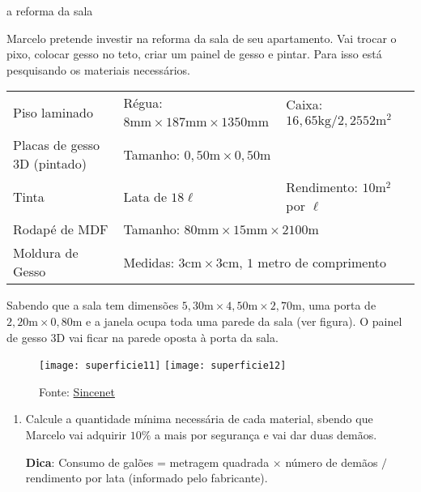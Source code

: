 \begin{task}{a reforma da sala}

Marcelo pretende investir na reforma da sala de seu apartamento. Vai trocar o pixo, colocar gesso no teto, criar um painel de gesso e pintar. Para isso está pesquisando os materiais necessários.

\begin{table}[H]
\centering
\setlength\tabcolsep{3pt}
\begin{tabular}{|l|ll|}
\hline
Piso laminado & Régua: $8\text{mm}\times187\text{mm}\times 1350$mm & Caixa: $16{,}65\text{kg}/2{,}2552\text{m}^2$ \\

Placas de gesso 3D (pintado) & Tamanho: $0{,}50\text{m}\times0{,}50\text{m}$ & \\

Tinta & Lata de $18\ell$ & Rendimento: $10\text{m}^2$ por $\ell$ \\

Rodapé de MDF & \multicolumn{2}{l|}{Tamanho: $80\text{mm}\times15\text{mm}\times2100\text{m}$} \\

Moldura de Gesso & \multicolumn{2}{l|}{Medidas: $3\text{cm}\times3\text{cm}$, $1$ metro de comprimento} \\
\hline
\end{tabular}
\end{table}



Sabendo que a sala tem dimensões $5{,}30\text{m}\times4{,}50\text{m}\times2{,}70\text{m}$, uma porta de $2{,}20\text{m}\times0{,}80\text{m}$ e a janela ocupa toda uma parede da sala (ver figura). O painel de gesso 3D vai ficar na parede oposta à porta da sala.

\begin{figure}[H]
\centering

\texttt{[image: superficie11]}
\hspace{1cm}
\texttt{[image: superficie12]}

\caption{Fonte: \href{https://blog.sincenet.com.br/como-calcular/}{Sincenet}}
\end{figure}

\begin{enumerate}
  \item Calcule a quantidade mínima necessária de cada material, sbendo que Marcelo vai adquirir $10\%$ a mais por segurança e vai dar duas demãos.

  \textbf{Dica}: Consumo de galões = metragem quadrada $\times$ número de demãos $/$ rendimento por lata (informado pelo fabricante).


\end{enumerate}
\end{task}
